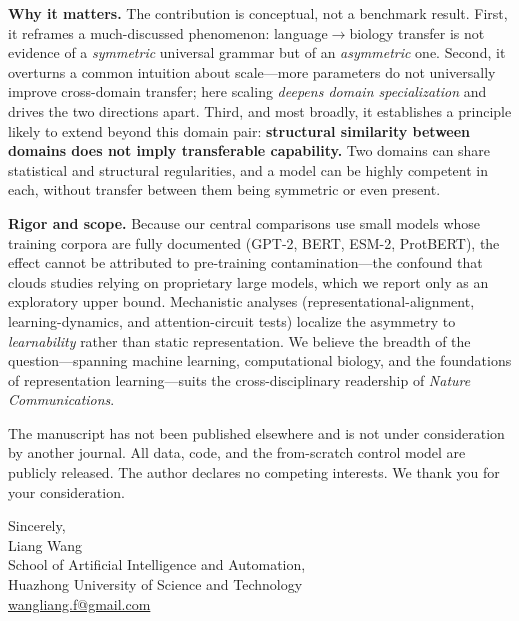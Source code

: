 \documentclass[11pt]{article}
\begin{document}
\textbf{Why it matters.} The contribution is conceptual, not a benchmark result. First, it reframes
a much-discussed phenomenon: language$\rightarrow$biology transfer is not evidence of a
\emph{symmetric} universal grammar but of an \emph{asymmetric} one. Second, it overturns a common
intuition about scale---more parameters do not universally improve cross-domain transfer; here
scaling \emph{deepens domain specialization} and drives the two directions apart. Third, and most
broadly, it establishes a principle likely to extend beyond this domain pair: \textbf{structural
similarity between domains does not imply transferable capability.} Two domains can share
statistical and structural regularities, and a model can be highly competent in each, without
transfer between them being symmetric or even present.

\textbf{Rigor and scope.} Because our central comparisons use small models whose training corpora
are fully documented (GPT-2, BERT, ESM-2, ProtBERT), the effect cannot be attributed to
pre-training contamination---the confound that clouds studies relying on proprietary large models,
which we report only as an exploratory upper bound. Mechanistic analyses (representational-alignment,
learning-dynamics, and attention-circuit tests) localize the asymmetry to \emph{learnability} rather
than static representation. We believe the breadth of the question---spanning machine learning,
computational biology, and the foundations of representation learning---suits the cross-disciplinary
readership of \emph{Nature Communications}.

The manuscript has not been published elsewhere and is not under consideration by another journal.
All data, code, and the from-scratch control model are publicly released. The author declares no
competing interests. We thank you for your consideration.

\vspace{1em}
\noindent Sincerely,\\[0.3em]
\noindent Liang Wang\\
\noindent School of Artificial Intelligence and Automation,\\
\noindent Huazhong University of Science and Technology\\
\noindent \href{mailto:wangliang.f@gmail.com}{wangliang.f@gmail.com}
\end{document}
